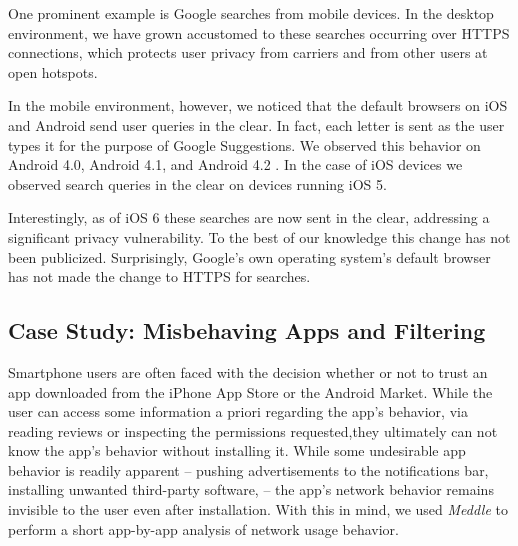 One prominent example is Google searches from mobile devices. In the 
desktop environment, we have grown accustomed to these searches 
occurring over HTTPS connections, which protects user privacy from 
carriers and from other users at open \wifi hotspots. 

In the mobile environment, however, we noticed that the default 
browsers on iOS and Android send user queries in the clear. In fact, 
each letter is sent as the user types it for the purpose of Google Suggestions. 
We
observed this behavior on Android 4.0, Android 4.1, and Android 4.2
. In the case of iOS devices we observed search queries
in the clear on devices running iOS 5. 

Interestingly, as of iOS 6 these searches are now sent in the clear, addressing 
a significant privacy vulnerability. To the best of our knowledge this 
change has not been publicized. Surprisingly, Google's own operating 
system's default browser has not made the change to HTTPS for searches.

%


\subsection{Case Study: Misbehaving Apps and Filtering}
\label{sec:case-study-filtering}

    Smartphone users are often faced with the decision whether or not to trust an app downloaded from the iPhone App Store or the Android Market.
    While the user can access some information a priori regarding the app's behavior, \eg{} via reading reviews or inspecting the permissions requested,they ultimately can not know the app's behavior without installing it.
    While some undesirable app behavior is readily apparent -- \eg{} pushing advertisements to the notifications bar, installing unwanted third-party software, \etc{} -- the app's network behavior remains invisible to the user even after installation.
    With this in mind, we used {\it Meddle} to perform a short app-by-app analysis of network usage behavior.
    
